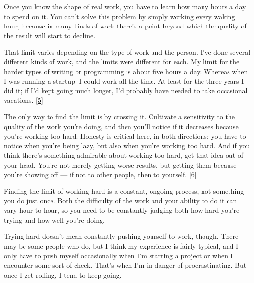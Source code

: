 Once you know the shape of real work, you have to
                  learn how many hours a day to spend on it. You can't solve
                  this problem by simply working every waking hour, because in
                  many kinds of work there's a point beyond which the quality of
                  the result will start to decline.

That limit varies
                  depending on the type of work and the person. I've done
                  several different kinds of work, and the limits were different
                  for each. My limit for the harder types of writing or
                  programming is about five hours a day. Whereas when I was
                  running a startup, I could work all the time. At least for the
                  three years I did it; if I'd kept going much longer, I'd
                  probably have needed to take occasional vacations.
                  [\href{\#f5n}{5}]

The only way to find the limit is by crossing it.
                  Cultivate a sensitivity to the quality of the work you're
                  doing, and then you'll notice if it decreases because you're
                  working too hard. Honesty is critical here, in both
                  directions: you have to notice when you're being lazy, but
                  also when you're working too hard. And if you think there's
                  something admirable about working too hard, get that idea out
                  of your head. You're not merely getting worse results, but
                  getting them because you're showing off --- if not to
                  other people, then to yourself.
                  [\href{\#f6n}{6}]

Finding the limit of working hard is a constant,
                  ongoing process, not something you do just once. Both the
                  difficulty of the work and your ability to do it can vary hour
                  to hour, so you need to be constantly judging both how hard
                  you're trying and how well you're doing.

Trying
                  hard doesn't mean constantly pushing yourself to work, though.
                  There may be some people who do, but I think my experience is
                  fairly typical, and I only have to push myself occasionally
                  when I'm starting a project or when I encounter some sort of
                  check. That's when I'm in danger of procrastinating. But once
                  I get rolling, I tend to keep going.

